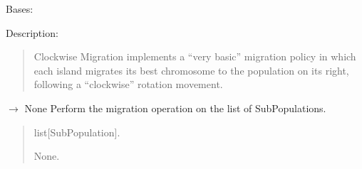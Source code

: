 \documentclass[letterpaper,10pt,english]{sphinxmanual}
\begin{document}
\begin{fulllineitems}
\label{\detokenize{pygenalgo.operators.migration:pygenalgo.operators.migration.clockwise_migration.ClockwiseMigration}}
\pysigstartsignatures
\pysiglinewithargsret
{}
{}
{}
\pysigstopsignatures
\sphinxAtStartPar
Bases: {\hyperref[\detokenize{pygenalgo.operators.migration:pygenalgo.operators.migration.migration_operator.MigrationOperator}]{}}

\sphinxAtStartPar
Description:
\begin{quote}

\sphinxAtStartPar
Clockwise Migration implements a “very basic” migration policy in which
each island migrates its best chromosome to the population on its right,
following a “clockwise” rotation movement.
\end{quote}

\begin{fulllineitems}
\label{\detokenize{pygenalgo.operators.migration:pygenalgo.operators.migration.clockwise_migration.ClockwiseMigration.migrate}}
\pysigstartsignatures
\pysiglinewithargsret
{}
{}
{{ $\rightarrow$ None}}
\pysigstopsignatures
\sphinxAtStartPar
Perform the migration operation on the list of SubPopulations.
\begin{quote}\begin{description}
\sphinxAtStartPar
{} \textendash{} list{[}SubPopulation{]}.

\sphinxAtStartPar
None.

\end{description}\end{quote}

\end{fulllineitems}


\end{fulllineitems}
\end{document}
